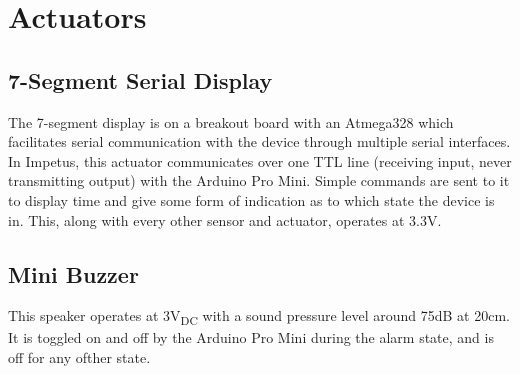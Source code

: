 \section{Actuators}
\subsection{7-Segment Serial Display}
The 7-segment display is on a breakout board with an Atmega328 which
facilitates serial communication with the device through multiple
serial interfaces. In Impetus, this actuator communicates over one TTL
line (receiving input, never transmitting output) with the Arduino Pro
Mini. Simple commands are sent to it to display time and give some
form of indication as to which state the device is in. This, along
with every other sensor and actuator, operates at 3.3V.

\subsection{Mini Buzzer}
This speaker operates at 3V\textsubscript{DC} with a sound pressure
level around 75dB at 20cm. It is toggled on and off by the Arduino Pro
Mini during the alarm state, and is off for any ofther state.
